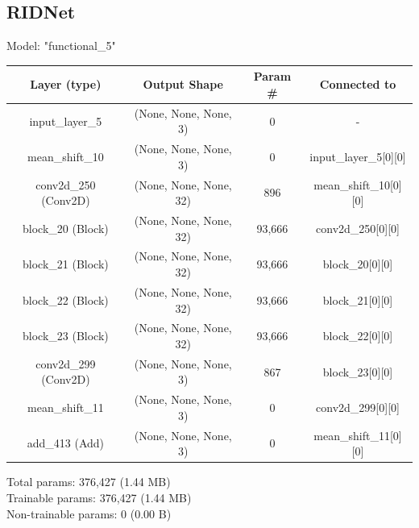 \documentclass[12pt,a4paper,openright,twoside]{book}
\begin{document}
\subsection{RIDNet}
Model: "functional\_5"\\
\begin{tabular}{|| c | c | c | c ||}
  \hline
  Layer (type) & Output Shape & Param \# & Connected to \\
  \hline
  input\_layer\_5 & (None, None, None, 3) & 0 & - \\
  \hline
  mean\_shift\_10 & (None, None, None, 3) & 0 & input\_layer\_5[0][0] \\
  \hline
  conv2d\_250 (Conv2D) & (None, None, None, 32) & 896 & mean\_shift\_10[0][0] \\
  \hline
  block\_20 (Block) & (None, None, None, 32) & 93,666 & conv2d\_250[0][0] \\
  \hline
  block\_21 (Block) & (None, None, None, 32) & 93,666 & block\_20[0][0] \\
  \hline
  block\_22 (Block) & (None, None, None, 32) & 93,666 & block\_21[0][0] \\
  \hline
  block\_23 (Block) & (None, None, None, 32) & 93,666 & block\_22[0][0] \\
  \hline
  conv2d\_299 (Conv2D) & (None, None, None, 3) & 867 & block\_23[0][0] \\
  \hline
  mean\_shift\_11 & (None, None, None, 3) & 0 & conv2d\_299[0][0] \\
  \hline
  add\_413 (Add) & (None, None, None, 3) & 0 & mean\_shift\_11[0][0] \\
  \hline
\end{tabular}

 Total params: 376,427 (1.44 MB)\\
 Trainable params: 376,427 (1.44 MB)\\
 Non-trainable params: 0 (0.00 B)\\
\end{document}
